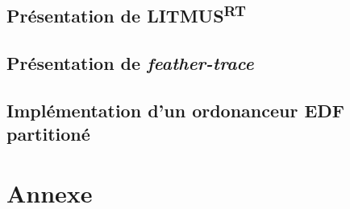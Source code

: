 \documentclass{article}
\newcommand{\litmus}{LITMUS\textsuperscript{RT}}
\begin{document}
    \subsection{Présentation de \litmus}
    
    \subsection{Présentation de \textit{feather-trace}}
    
    \subsection{Implémentation d'un ordonanceur EDF partitioné}
    
    
    
    
    
    \newpage
    \section*{Annexe}
    

    \newpage
    \newpage
    \listoffigures
    
    \printnoidxglossaries
\end{document}
